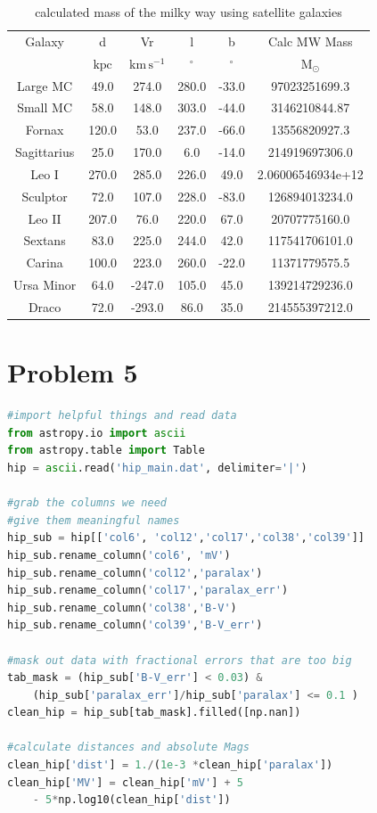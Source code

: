 \documentclass[12pt]{article}
\begin{document}
\begin{table}
\begin{tabular}{cccccc}
Galaxy & d & Vr & l & b & Calc MW Mass \\
 & $\mathrm{kpc}$ & $\mathrm{km\,s^{-1}}$ & $\mathrm{{}^{\circ}}$ & $\mathrm{{}^{\circ}}$ & $\mathrm{M_{\odot}}$ \\
Large MC & 49.0 & 274.0 & 280.0 & -33.0 & 97023251699.3 \\
Small MC & 58.0 & 148.0 & 303.0 & -44.0 & 3146210844.87 \\
Fornax & 120.0 & 53.0 & 237.0 & -66.0 & 13556820927.3 \\
Sagittarius & 25.0 & 170.0 & 6.0 & -14.0 & 214919697306.0 \\
Leo I & 270.0 & 285.0 & 226.0 & 49.0 & 2.06006546934e+12 \\
Sculptor & 72.0 & 107.0 & 228.0 & -83.0 & 126894013234.0 \\
Leo II & 207.0 & 76.0 & 220.0 & 67.0 & 20707775160.0 \\
Sextans & 83.0 & 225.0 & 244.0 & 42.0 & 117541706101.0 \\
Carina & 100.0 & 223.0 & 260.0 & -22.0 & 11371779575.5 \\
Ursa Minor & 64.0 & -247.0 & 105.0 & 45.0 & 139214729236.0 \\
Draco & 72.0 & -293.0 & 86.0 & 35.0 & 214555397212.0 \\
\end{tabular}
\caption{calculated mass of the milky way using satellite galaxies}
\end{table}
\section{Problem 5}
\begin{lstlisting}[language=Python]
#import helpful things and read data
from astropy.io import ascii
from astropy.table import Table
hip = ascii.read('hip_main.dat', delimiter='|')

#grab the columns we need
#give them meaningful names
hip_sub = hip[['col6', 'col12','col17','col38','col39']]
hip_sub.rename_column('col6', 'mV')
hip_sub.rename_column('col12','paralax')
hip_sub.rename_column('col17','paralax_err')
hip_sub.rename_column('col38','B-V')
hip_sub.rename_column('col39','B-V_err')

#mask out data with fractional errors that are too big
tab_mask = (hip_sub['B-V_err'] < 0.03) & 
	(hip_sub['paralax_err']/hip_sub['paralax'] <= 0.1 )
clean_hip = hip_sub[tab_mask].filled([np.nan])

#calculate distances and absolute Mags
clean_hip['dist'] = 1./(1e-3 *clean_hip['paralax'])
clean_hip['MV'] = clean_hip['mV'] + 5 
	- 5*np.log10(clean_hip['dist'])
\end{lstlisting}
\end{document}
